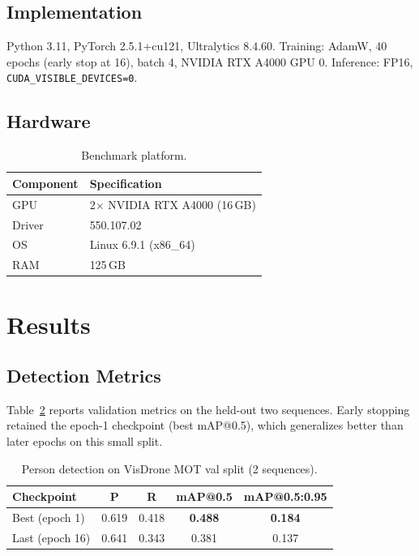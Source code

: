 \documentclass[10pt,twocolumn,letterpaper]{article}
\begin{document}
\subsection{Implementation}
Python 3.11, PyTorch 2.5.1+cu121, Ultralytics 8.4.60. Training: AdamW, 40 epochs (early stop at 16), batch 4, NVIDIA RTX A4000 GPU 0. Inference: FP16, \texttt{CUDA\_VISIBLE\_DEVICES=0}.

\subsection{Hardware}
\begin{table}[h]
\centering
\caption{Benchmark platform.}
\label{tab:hw}
\small
\begin{tabular}{ll}
\toprule
Component & Specification \\
\midrule
GPU & 2$\times$ NVIDIA RTX A4000 (16\,GB) \\
Driver & 550.107.02 \\
OS & Linux 6.9.1 (x86\_64) \\
RAM & 125\,GB \\
\bottomrule
\end{tabular}
\end{table}

\section{Results}
\label{sec:results}

\subsection{Detection Metrics}
Table~\ref{tab:det} reports validation metrics on the held-out two sequences. Early stopping retained the epoch-1 checkpoint (best mAP@0.5), which generalizes better than later epochs on this small split.

\begin{table}[h]
\centering
\caption{Person detection on VisDrone MOT val split (2 sequences).}
\label{tab:det}
\small
\begin{tabular}{lcccc}
\toprule
Checkpoint & P & R & mAP@0.5 & mAP@0.5:0.95 \\
\midrule
Best (epoch 1) & 0.619 & 0.418 & \textbf{0.488} & \textbf{0.184} \\
Last (epoch 16) & 0.641 & 0.343 & 0.381 & 0.137 \\
\bottomrule
\end{tabular}
\end{table}
\end{document}
